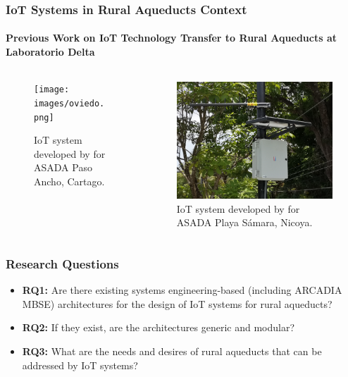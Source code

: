 \documentclass{beamer}
\begin{document}
\begin{frame}
    \frametitle{\small IoT Systems in Rural Aqueducts Context}
    \framesubtitle{Previous Work on IoT Technology Transfer to Rural Aqueducts at Laboratorio Delta}

    \begin{columns}[T] %
        \begin{column}{0.5\textwidth}
            \begin{figure}
                \texttt{[image: images/oviedo.png]}
                \caption{IoT system developed by \cite{Oviedo2024} for ASADA Paso Ancho, Cartago.}
            \end{figure}
        \end{column}
        \begin{column}{0.5\textwidth}
            \begin{figure}
                \includegraphics[width=\columnwidth]{images/solorzano.png}
                \caption{IoT system developed by \cite{Solorzano2021} for ASADA Playa Sámara, Nicoya.}
            \end{figure}
        \end{column}
    \end{columns}
\end{frame}

\begin{frame}
    \frametitle{Research Questions}

    \begin{itemize}
        \item \textbf{RQ1:} Are there existing systems engineering-based (including ARCADIA MBSE) architectures for the design of IoT systems for rural aqueducts?
        \item \textbf{RQ2:} If they exist, are the architectures generic and modular?
        \item \textbf{RQ3:} What are the needs and desires of rural aqueducts that can be addressed by IoT systems?
    \end{itemize} 
\end{frame}
\end{document}
